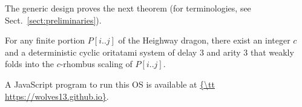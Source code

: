 The generic design proves the next theorem (for terminologies, see Sect.~\ref{sect:preliminaries}). 

\begin{theorem}\label{thm:main}
	For any finite portion $P[i..j]$ of the Heighway dragon, there exist an integer $c$ and a deterministic cyclic oritatami system of delay 3 and arity 3 that weakly folds into the $c$-rhombus scaling of $P[i..j]$. 
\end{theorem}

\noindent
A JavaScript program to run this OS is available at \url{{\tt https://wolves13.github.io}}. 

